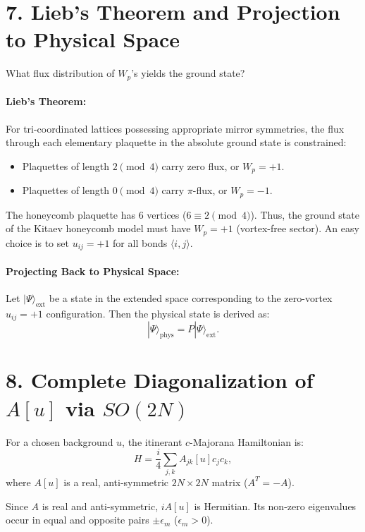 \documentclass[11pt,a4paper]{article}
\begin{document}
\section*{7. Lieb's Theorem and Projection to Physical Space}

What flux distribution of $W_p$'s yields the ground state?

\paragraph{Lieb's Theorem:}
For tri-coordinated lattices possessing appropriate mirror symmetries, the flux through each elementary plaquette in the absolute ground state is constrained:
\begin{itemize}
    \item Plaquettes of length $2 \pmod 4$ carry zero flux, or $W_p = +1$.
    \item Plaquettes of length $0 \pmod 4$ carry $\pi$-flux, or $W_p = -1$.
\end{itemize}
The honeycomb plaquette has 6 vertices ($6 \equiv 2 \pmod 4$). Thus, the ground state of the Kitaev honeycomb model must have $W_p = +1$ (vortex-free sector).
An easy choice is to set $u_{ij} = +1$ for all bonds $\langle i,j \rangle$.

\paragraph{Projecting Back to Physical Space:}
Let $|\Psi\rangle_{\text{ext}}$ be a state in the extended space corresponding to the zero-vortex $u_{ij} = +1$ configuration. Then the physical state is derived as:
\begin{equation}
    |\Psi\rangle_{\text{phys}} = P |\Psi\rangle_{\text{ext}}.
\end{equation}


\section*{8. Complete Diagonalization of $A[u]$ via $SO(2N)$}

For a chosen background $u$, the itinerant $c$-Majorana Hamiltonian is:
\begin{equation}
    H = \frac{i}{4} \sum_{j,k} A_{jk}[u] c_j c_k,
\end{equation}
where $A[u]$ is a real, anti-symmetric $2N \times 2N$ matrix ($A^T = -A$).

Since $A$ is real and anti-symmetric, $iA[u]$ is Hermitian. Its non-zero eigenvalues occur in equal and opposite pairs $\pm \epsilon_m$ ($\epsilon_m > 0$).
\end{document}
